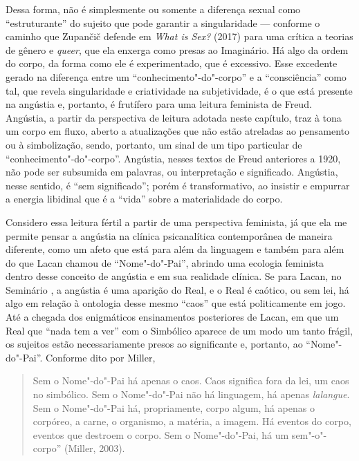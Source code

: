Dessa forma, não é simplesmente ou somente a diferença sexual como
``estruturante'' do sujeito que pode garantir a singularidade ---
conforme o caminho que Zupančič defende em \emph{What is Sex?} (2017)
para uma crítica a teorias de gênero e \emph{queer}, que ela enxerga
como presas ao Imaginário. Há algo da ordem do corpo, da forma como ele
é experimentado, que é excessivo. Esse excedente gerado na diferença
entre um ``conhecimento"-do"-corpo'' e a ``consciência'' como tal, que
revela singularidade e criatividade na subjetividade, é o que está
presente na angústia e, portanto, é frutífero para uma leitura feminista
de Freud. Angústia, a partir da perspectiva de leitura adotada neste
capítulo, traz à tona um corpo em fluxo, aberto a atualizações que não
estão atreladas ao pensamento ou à simbolização, sendo, portanto, um
sinal de um tipo particular de ``conhecimento"-do"-corpo''. Angústia,
nesses textos de Freud anteriores a 1920, não pode ser subsumida em
palavras, ou interpretação e significado. Angústia, nesse sentido, é
``sem significado''; porém é transformativo, ao insistir e empurrar a
energia libidinal que é a ``vida'' sobre a materialidade do corpo.

Considero essa leitura fértil a partir de uma perspectiva feminista, já
que ela me permite pensar a angústia na clínica psicanalítica
contemporânea de maneira diferente, como um afeto que está para além da
linguagem e também para além do que Lacan chamou de ``Nome"-do"-Pai'',
abrindo uma ecologia feminista dentro desse conceito de angústia e em
sua realidade clínica. Se para Lacan, no Seminário , a angústia é uma
aparição do Real, e o Real é caótico, ou sem lei, há algo em relação à
ontologia desse mesmo ``caos'' que está politicamente em jogo. Até a
chegada dos enigmáticos ensinamentos posteriores de Lacan, em que um
Real que ``nada tem a ver'' com o Simbólico aparece de um modo um tanto
frágil, os sujeitos estão necessariamente presos ao significante e,
portanto, ao ``Nome"-do"-Pai''. Conforme dito por Miller,

\begin{quote}
Sem o Nome"-do"-Pai há apenas o caos. Caos significa fora da lei, um caos
no simbólico. Sem o Nome"-do"-Pai não há linguagem, há apenas
\emph{lalangue}. Sem o Nome"-do"-Pai há, propriamente, corpo algum, há
apenas o corpóreo, a carne, o organismo, a matéria, a imagem. Há eventos
do corpo, eventos que destroem o corpo. Sem o Nome"-do"-Pai, há um
sem"-o"-corpo'' (Miller, 2003).
\end{quote}

